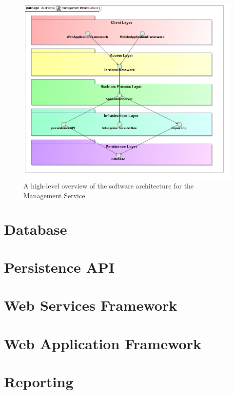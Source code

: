 \begin{figure}[H]
  \begin{center}
  \includegraphics[scale=0.4]{../Diagrams and Charts/Overview/ManagementInfrastructure.jpg}
  \caption{A high-level overview of the software architecture for the Management Service}
  \label{fig:managementInfrastructure}
  \end{center}
\end{figure}

\section{Database}


\section{Persistence API}


\section{Web Services Framework}


\section{Web Application Framework}


\section{Reporting}
